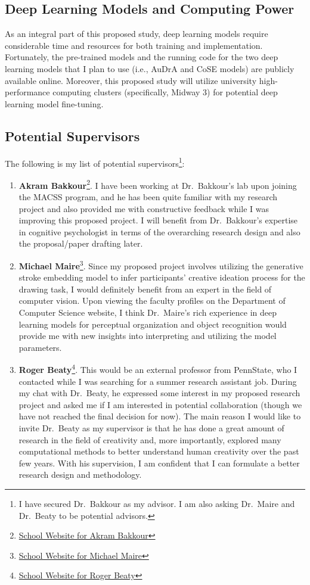 \documentclass[../Proposal.tex]{subfiles}
\begin{document}
\subsection*{Deep Learning Models and Computing Power}
As an integral part of this proposed study, deep learning models require considerable time and resources for both training and implementation. Fortunately, the pre-trained models and the running code for the two deep learning models that I plan to use (i.e., AuDrA and CoSE models) are publicly available online. Moreover, this proposed study will utilize university high-performance computing clusters (specifically, Midway 3) for potential deep learning model fine-tuning.

\subsection*{Potential Supervisors}
The following is my list of potential supervisors\footnote{I have secured Dr.~Bakkour as my advisor. I am also asking Dr.~Maire and Dr.~Beaty to be potential advisors.}:
\begin{enumerate}
    \item \textbf{Akram Bakkour}\footnote{\href{https://psychology.uchicago.edu/directory/Akram-Bakkour}{School Website for Akram Bakkour}}. I have been working at Dr.~Bakkour's lab upon joining the MACSS program, and he has been quite familiar with my research project and also provided me with constructive feedback while I was improving this proposed project. I will benefit from Dr.~Bakkour's expertise in cognitive psychologist in terms of the overarching research design and also the proposal/paper drafting later. 
    \item \textbf{Michael Maire}\footnote{\href{https://cs.uchicago.edu/people/michael-maire/}{School Website for Michael Maire}}. Since my proposed project involves utilizing the generative stroke embedding model to infer participants' creative ideation process for the drawing task, I would definitely benefit from an expert in the field of computer vision. Upon viewing the faculty profiles on the Department of Computer Science website, I think Dr.~Maire's rich experience in deep learning models for perceptual organization and object recognition would provide me with new insights into interpreting and utilizing the model parameters. 
    \item \textbf{Roger Beaty}\footnote{\href{https://psych.la.psu.edu/people/rub736/}{School Website for Roger Beaty}}. This would be an external professor from PennState, who I contacted while I was searching for a summer research assistant job. During my chat with Dr.~Beaty, he expressed some interest in my proposed research project and asked me if I am interested in potential collaboration (though we have not reached the final decision for now). The main reason I would like to invite Dr.~Beaty as my supervisor is that he has done a great amount of research in the field of creativity and, more importantly, explored many computational methods to better understand human creativity over the past few years. With his supervision, I am confident that I can formulate a better research design and methodology. 
\end{enumerate}
\end{document}

